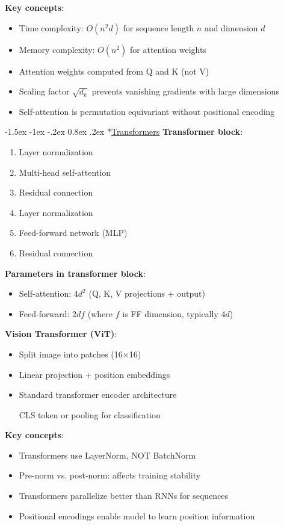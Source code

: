 \documentclass{article}
\makeatletter
\renewcommand\section{\@startsection{section}{1}{\z@}%
                                  {-1.5ex \@plus -1ex \@minus -.2ex}%
                                  {0.8ex \@plus.2ex}%
                                  {\normalfont\small\bfseries}}
\makeatother
\begin{document}
\begin{multicols}{3}
\textbf{Key concepts}:
\begin{itemize}
\item Time complexity: $O(n^2d)$ for sequence length $n$ and dimension $d$
\item Memory complexity: $O(n^2)$ for attention weights
\item Attention weights computed from Q and K (not V)
\item Scaling factor $\sqrt{d_k}$ prevents vanishing gradients with large dimensions
\item Self-attention is permutation equivariant without positional encoding
\end{itemize}

\section*{\underline{Transformers}}
\textbf{Transformer block}:
\begin{enumerate}
\item Layer normalization
\item Multi-head self-attention
\item Residual connection
\item Layer normalization
\item Feed-forward network (MLP)
\item Residual connection
\end{enumerate}

\textbf{Parameters in transformer block}:
\begin{itemize}
\item Self-attention: $4d^2$ (Q, K, V projections + output)
\item Feed-forward: $2df$ (where $f$ is FF dimension, typically $4d$)
\end{itemize}

\textbf{Vision Transformer (ViT)}:
\begin{itemize}
\item Split image into patches (16×16)
\item Linear projection + position embeddings
\item Standard transformer encoder architecture
\item [CLS] token or pooling for classification
\end{itemize}

\textbf{Key concepts}:
\begin{itemize}
\item Transformers use LayerNorm, NOT BatchNorm
\item Pre-norm vs. post-norm: affects training stability
\item Transformers parallelize better than RNNs for sequences
\item Positional encodings enable model to learn position information
\end{itemize}


\end{multicols}
\end{document}
